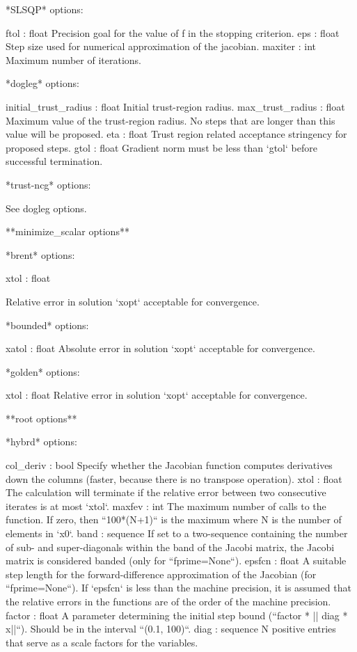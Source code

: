 \begin{DoxyVerb}
*SLSQP* options:

    ftol : float
        Precision goal for the value of f in the stopping criterion.
    eps : float
        Step size used for numerical approximation of the jacobian.
    maxiter : int
        Maximum number of iterations.

*dogleg* options:

    initial_trust_radius : float
        Initial trust-region radius.
    max_trust_radius : float
        Maximum value of the trust-region radius. No steps that are longer
        than this value will be proposed.
    eta : float
        Trust region related acceptance stringency for proposed steps.
    gtol : float
        Gradient norm must be less than `gtol` before successful
        termination.

*trust-ncg* options:

    See dogleg options.


**minimize_scalar options**

*brent* options:

    xtol : float

        Relative error in solution `xopt` acceptable for convergence.

*bounded* options:

    xatol : float
        Absolute error in solution `xopt` acceptable for convergence.

*golden* options:

    xtol : float
        Relative error in solution `xopt` acceptable for convergence.


**root options**

*hybrd* options:

    col_deriv : bool
        Specify whether the Jacobian function computes derivatives down
        the columns (faster, because there is no transpose operation).
    xtol : float
        The calculation will terminate if the relative error between
        two consecutive iterates is at most `xtol`.
    maxfev : int
        The maximum number of calls to the function. If zero, then
        ``100*(N+1)`` is the maximum where N is the number of elements
        in `x0`.
    band : sequence
        If set to a two-sequence containing the number of sub- and
        super-diagonals within the band of the Jacobi matrix, the
        Jacobi matrix is considered banded (only for ``fprime=None``).
    epsfcn : float
        A suitable step length for the forward-difference approximation
        of the Jacobian (for ``fprime=None``). If `epsfcn` is less than
        the machine precision, it is assumed that the relative errors
        in the functions are of the order of the machine precision.
    factor : float
        A parameter determining the initial step bound (``factor * ||
        diag * x||``).  Should be in the interval ``(0.1, 100)``.
    diag : sequence
        N positive entries that serve as a scale factors for the
        variables.


\end{DoxyVerb}
